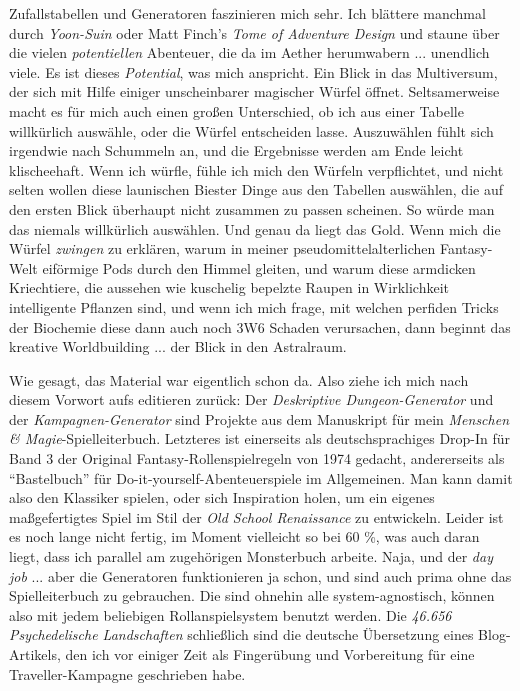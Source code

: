 
Zufallstabellen und Generatoren faszinieren mich sehr. Ich blättere
manchmal durch \textit{Yoon-Suin} oder Matt Finch's \textit{Tome of
Adventure Design} und staune über die vielen \textit{potentiellen}
Abenteuer, die da im Aether herumwabern ... unendlich viele. 
Es ist dieses \textit{Potential}, was
mich anspricht. Ein Blick in das Multiversum, der sich mit Hilfe
einiger unscheinbarer magischer Würfel öffnet. Seltsamerweise macht
es für mich auch einen großen Unterschied, ob ich aus einer Tabelle
willkürlich auswähle, oder die Würfel entscheiden lasse. Auszuwählen
fühlt sich irgendwie nach Schummeln an, und die Ergebnisse werden am
Ende leicht klischeehaft. Wenn ich würfle, fühle ich
mich den Würfeln verpflichtet, und nicht selten wollen diese
launischen Biester Dinge aus den Tabellen auswählen, die 
auf den ersten Blick überhaupt nicht zusammen zu passen scheinen. So
würde man das niemals willkürlich auswählen. Und genau da liegt das
Gold. Wenn mich die Würfel \textit{zwingen} zu erklären, warum in
meiner pseudomittelalterlichen Fantasy-Welt eiförmige Pods durch den
Himmel gleiten, und warum diese armdicken Kriechtiere, die aussehen wie
kuschelig bepelzte Raupen in Wirklichkeit intelligente Pflanzen
sind, und wenn ich mich frage, mit welchen perfiden Tricks der
Biochemie diese dann auch noch 3W6 Schaden verursachen, dann beginnt
das kreative Worldbuilding ... der Blick in den Astralraum.

Wie gesagt, das Material war eigentlich schon da. Also ziehe ich
mich nach diesem Vorwort aufs editieren zurück: Der 
\textit{Deskriptive Dungeon-Generator} und der
\textit{Kampagnen-Generator} sind Projekte aus dem Manuskript für
mein \textit{Menschen \& Magie}-Spielleiterbuch. Letzteres ist
einerseits als deutschsprachiges Drop-In 
für Band 3 der Original Fantasy-Rollenspielregeln von 1974 gedacht,
andererseits als ``Bastelbuch'' für Do-it-yourself-Abenteuerspiele im
Allgemeinen. Man kann damit also den Klassiker spielen, oder 
sich Inspiration holen, um ein eigenes maßgefertigtes Spiel im
Stil der \textit{Old School Renaissance} zu entwickeln. Leider 
ist es noch lange nicht fertig, im Moment vielleicht so bei 60 \%, was
auch daran liegt, dass ich parallel am zugehörigen Monsterbuch
arbeite. Naja, und der \textit{day job} ... aber
die Generatoren funktionieren ja schon, und sind auch prima ohne das
Spielleiterbuch zu gebrauchen. Die sind ohnehin alle
system-agnostisch, können also mit jedem beliebigen
Rollanspielsystem benutzt werden. Die \textit{46.656 Psychedelische
Landschaften} schließlich sind die deutsche Übersetzung eines
Blog-Artikels, den ich vor einiger Zeit als Fingerübung und
Vorbereitung für eine Traveller-Kampagne geschrieben habe.  

